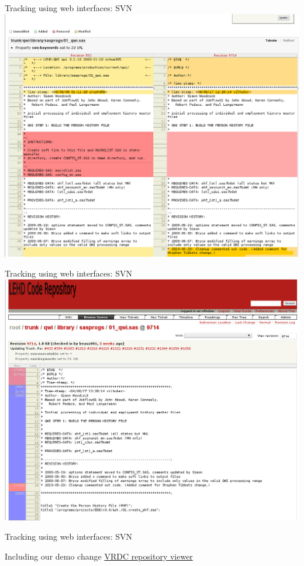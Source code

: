 \documentclass[xcolor=table,compress]{beamer}
\begin{document}
\begin{frame}{Tracking using web interfaces: SVN}
\includegraphics[width=.9\textwidth]{trac-svn-view3.png}
\end{frame}

\begin{frame}{Tracking using web interfaces: SVN}
\includegraphics[width=.9\textwidth]{trac-svn-view4.png}
\end{frame}

\begin{frame}{Tracking using web interfaces: SVN}
\begin{block}{Including our demo change}
\href{http://repository.vrdc.cornell.edu/websvn/}{VRDC repository viewer}
\end{block}
\end{frame}
\end{document}
